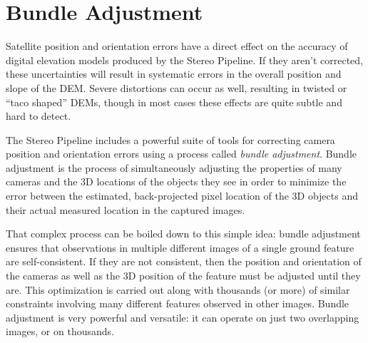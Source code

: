 \chapter{Bundle Adjustment}
\label{ch:bundle_adjustment}


Satellite position and orientation errors have a direct effect on the
accuracy of digital elevation models produced by the Stereo Pipeline.
If they aren't corrected, these uncertainties will result in
systematic errors in the overall position and slope of the DEM.  Severe
distortions can occur as well, resulting in twisted or ``taco shaped''
DEMs, though in most cases these effects are quite subtle and hard to
detect.

The Stereo Pipeline includes a powerful suite of tools for correcting
camera position and orientation errors using a process called
\emph{bundle adjustment}.  Bundle adjustment is the process of
simultaneously adjusting the properties of many cameras and the 3D
locations of the objects they see in order to minimize the error
between the estimated, back-projected pixel location of the 3D
objects and their actual measured location in the captured images.

That complex process can be boiled down to this simple idea: bundle
adjustment ensures that observations in multiple different images of a
single ground feature are self-consistent. If they are not consistent,
then the position and orientation of the cameras as well as the 3D
position of the feature must be adjusted until they are.  This
optimization is carried out along with thousands (or more) of similar
constraints involving many different features observed in other
images.  Bundle adjustment is very powerful and versatile: it can
operate on just two overlapping images, or on thousands.

